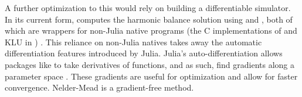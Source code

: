 A further optimization to this would rely on building a differentiable simulator.
In its current form,  computes the harmonic balance
solution using  and , both of which are wrappers for
non-Julia native programs (the C implementations of
 and KLU in ) \cite{fftwjl, klujl, 
fftw, klu}. This reliance on non-Julia natives takes away the automatic differentiation
features introduced by Julia. Julia's auto-differentiation allows packages like 
to take derivatives of functions, and as such, find gradients along a parameter space \cite{fluxjl}. 
These gradients are useful for optimization and allow for faster convergence. Nelder-Mead
is a gradient-free method.